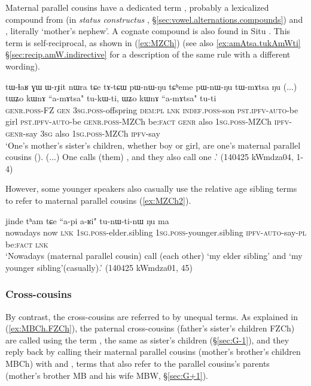 Maternal parallel cousins have a dedicated term , probably a lexicalized compound from  (in \textit{status constructus} , §\ref{sec:vowel.alternations.compounds}) and , literally `mother's nephew'. A cognate compound is also found in Situ \citep{zhangsy20kinship}. This term is self-reciprocal, as shown in (\ref{ex:MZCh}) (see also \ref{ex:amAtsa.tukAmWti} §\ref{sec:recip.amW.indirective} for a description of the same rule with a different wording).

\begin{exe}
\ex \label{ex:MZCh}
\gll tɯ-ɬaʁ ɣɯ ɯ-rɟit nɯra tɕe tɤ-tɕɯ pɯ-nɯ-ŋu tɕʰeme pɯ-nɯ-ŋu tɯ-mɤtsa ŋu (...) tɯʑo kɯnɤ ``a-mɤtsa" tu-kɯ-ti, ɯʑo kɯnɤ ``a-mɤtsa" tu-ti \\
\textsc{genr}.\textsc{poss}-FZ \textsc{gen} \textsc{3sg}.\textsc{poss}-offspring \textsc{dem}:\textsc{pl} \textsc{lnk} \textsc{indef}.\textsc{poss}-son \textsc{pst}.\textsc{ipfv}-\textsc{auto}-be girl \textsc{pst}.\textsc{ipfv}-\textsc{auto}-be \textsc{genr}.\textsc{poss}-MZCh be:\textsc{fact} {  } \textsc{genr} also \textsc{1sg}.\textsc{poss}-MZCh \textsc{ipfv}-\textsc{genr}-say \textsc{3sg} also \textsc{1sg}.\textsc{poss}-MZCh \textsc{ipfv}-say \\
\glt `One's mother's sister's children, whether boy or girl, are one's maternal parallel cousins (). (...) One calls (them) , and they also call one .' (140425 kWmdza04, 1-4)
\end{exe}

However, some younger speakers also casually use the relative age sibling terms to refer to maternal parallel cousins (\ref{ex:MZCh2}). 

\begin{exe}
\ex \label{ex:MZCh2}
\gll jinde tʰam tɕe ``a-pi a-ʁi" tu-nɯ-ti-nɯ ŋu ma  \\
nowadays now \textsc{lnk} \textsc{1sg}.\textsc{poss}-elder.sibling \textsc{1sg}.\textsc{poss}-younger.sibling \textsc{ipfv}-\textsc{auto}-say-\textsc{pl} be:\textsc{fact} \textsc{lnk} \\
\glt `Nowadays (maternal parallel cousin) call (each other)  `my elder sibling' and   `my younger sibling'(casually).' (140425 kWmdza01, 45)
\end{exe}


\subsubsection{Cross-cousins} \label{sec:ego.cross.cousins}
By contrast, the cross-cousins are referred to by unequal terms. As explained in (\ref{ex:MBCh.FZCh}), the paternal cross-cousins (father's sister's children FZCh) are called using the term , the same as sister's children (§\ref{sec:G-1}), and they reply back by calling their maternal parallel cousins (mother's brother's children MBCh) with  and , terms that also refer to the parallel cousins's parents (mother's brother MB and his wife MBW, §\ref{sec:G+1}). 


